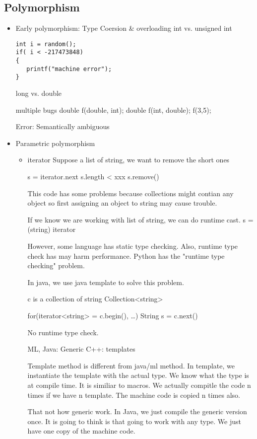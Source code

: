 \documentclass[11pt]{article}
\begin{document}
\subsection{Polymorphism}
\label{sec:org5d2bc44}
\begin{itemize}
\item Early polymorphism: Type Coersion \& overloading
int vs. unsigned int
\begin{verbatim}
int i = random();
if( i < -217473848)
{
   printf("machine error");
}
\end{verbatim}

long vs. double

multiple bugs
double f(double, int);
double f(int, double);
f(3,5);

Error: Semantically ambiguous

\item Parametric polymorphism
\begin{itemize}
\item iterator
Suppose a list of string, we want to remove the short ones

s = iterator.next
s.length < xxx
s.remove()

This code has some problems because collections might contian any object
so first assigning an object to string may cause trouble.

If we know we are working with list of string, we can do runtime cast.
s = (string) iterator

However, some language has static type checking.
Also, runtime type check has may harm performance. Python has the
"runtime type checking" problem.

In java, we use java template to solve this problem.

c is a collection of string Collection<string>

for(iterator<string> = c.begin(), \ldots{})
   String s = c.next()

No runtime type check.

ML, Java: Generic
C++: templates

Template method is different from java/ml method. In template, we
instantiate the template with the actual type. We know what the type is
at compile time. It is similiar to macros. We actually compitle the code
n times if we have n template. The machine code is copied n times also.

That not how generic work. In Java, we just compile the generic version
once. It is going to think is that going to work with any type. We just
have one copy of the machine code. 


\end{itemize}
\end{itemize}
\end{document}
